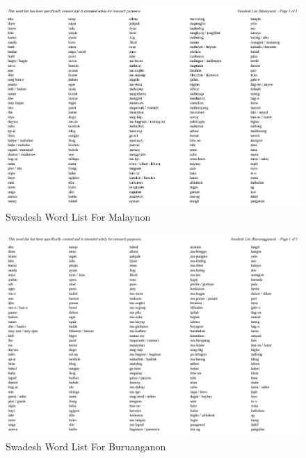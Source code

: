 \begin{figure}[h!]
	\centering
	\includegraphics[width=\textwidth]{./appendix/swadesh_malaynon.png}
	\caption{Swadesh Word List For Malaynon}
	\label{fig:swadeshMalaynon}
\end{figure}

\begin{figure}[h!]
	\centering
	\includegraphics[width=\textwidth]{./appendix/swadesh_buruanganon.png}
	\caption{Swadesh Word List For Buruanganon}
	\label{fig:swadeshBuruanganon}
\end{figure}

